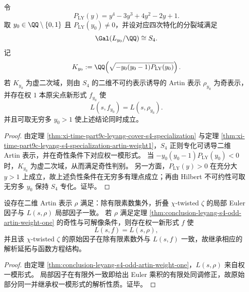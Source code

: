 \begin{theorem}\label{thm:conclusion-leyang-s4-odd-artin-weight-one}
令
\[
P_{\mathrm{LY}}(y)=y^4-3y^3+4y^2-2y+1.
\]
取 \(y_0\in\QQ\setminus\{0,1\}\) 且 \(P_{\mathrm{LY}}(y_0)\neq 0\)，并设对应四次特化的分裂域满足
\[
\Gal(L_{y_0}/\QQ)\cong S_4.
\]
记
\[
K_{y_0}:=\QQ\!\left(\sqrt{-y_0(y_0-1)P_{\mathrm{LY}}(y_0)}\right).
\]
若 \(K_{y_0}\) 为虚二次域，则由 \(S_4\) 的二维不可约表示诱导的 Artin 表示 \(\rho_{y_0}\) 为奇表示，并存在权 \(1\) 本原尖点新形式 \(f_{y_0}\) 使
\[
L(s,f_{y_0})=L(s,\rho_{y_0}).
\]
并且可取无穷多 \(y_0>1\) 使上述结论同时成立。
\end{theorem}
\begin{proof}
由定理 \ref{thm:xi-time-part9c-leyang-cover-s4-specialization} 与定理 \ref{thm:xi-time-part9c-leyang-s4-specialization-artin-weight1}，\(S_4\) 正则专化可诱导二维 Artin 表示，并在奇性条件下对应权一模形式。
当 \(-y_0(y_0-1)P_{\mathrm{LY}}(y_0)<0\) 时，\(K_{y_0}\) 为虚二次域，从而满足奇性判别。
另一方面，\(P_{\mathrm{LY}}(y)>0\) 在充分大 \(y>1\) 上成立，故上述负性条件在无穷多有理点成立；再由 Hilbert 不可约性可取无穷多 \(y_0\) 保持 \(S_4\) 专化。证毕。
\end{proof}

\begin{corollary}\label{cor:conclusion-chi-twisted-zeta-conditional-modularity}
设存在二维 Artin 表示 \(\rho\) 满足：除有限素数集外，折叠 \(\chi\)-twisted \(\zeta\) 的局部 Euler 因子与 \(L(s,\rho)\) 局部因子一致。
若 \(\rho\) 满足定理 \ref{thm:conclusion-leyang-s4-odd-artin-weight-one} 的奇性与可解像条件，则存在权一新形式 \(f\) 使
\[
L(s,f)=L(s,\rho),
\]
并且该 \(\chi\)-twisted \(\zeta\) 的原始因子在除有限素数外与 \(L(s,f)\) 一致，故继承相应的解析延拓与函数方程结构。
\end{corollary}
\begin{proof}
由定理 \ref{thm:conclusion-leyang-s4-odd-artin-weight-one}，\(L(s,\rho)\) 来自权一模形式。
局部因子在有限外一致即给出 Euler 乘积的有限处同调修正，故原始部分同一并继承权一模形式的解析性质。证毕。
\end{proof}

